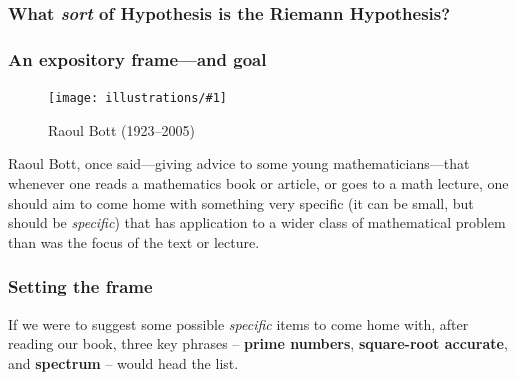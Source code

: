 \documentclass{beamer}
\newcommand{\ill}[3]{%
   \begin{figure}[H]%
   \vspace{-2ex}
   \centering%
   \texttt{[image: illustrations/\#1]}%
   \caption{#3}%
   \vspace{-2ex}
    \end{figure}}
\newcommand{\RH}{Riemann Hypothesis\index{Riemann Hypothesis}}
\begin{document}
\begin{frame}\frametitle{\bf\large What {\em sort} of Hypothesis is the \RH{}?}
 \begin{center}
       \end{center}
      \end{frame}
\begin{frame}\frametitle{An expository frame---and goal}\vskip10pt
\ill{raoulbott}{0.20}{Raoul Bott (1923--2005)\label{fig:bott}}

Raoul Bott, once
said---giving advice to some young mathematicians---that whenever one
reads a mathematics book or article, or goes to a math lecture, one
should aim to come home with something very specific (it can be small,
but should be {\em specific}) that has application to a wider class of
mathematical problem than was the focus of the text or lecture.

\end{frame}

\begin{frame}\frametitle{Setting the frame}
 If we
were to suggest some possible {\em specific} items to come home with,
after reading our book, three key phrases -- {\bf prime numbers}, {\bf
  square-root accurate}, and {\bf spectrum} -- would head the
list.

\end{frame}
\end{document}

